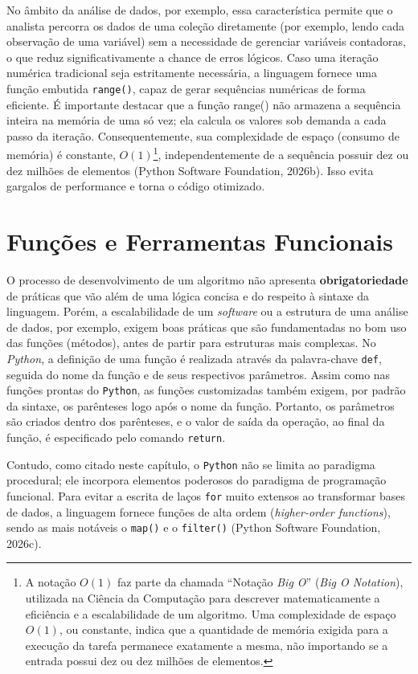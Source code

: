 \documentclass[
  brazilian,
  letterpaper,
  DIV=11,
  numbers=noendperiod]{scrreprt}
\begin{document}
No âmbito da análise de dados, por exemplo, essa característica permite
que o analista percorra os dados de uma coleção diretamente (por
exemplo, lendo cada observação de uma variável) sem a necessidade de
gerenciar variáveis contadoras, o que reduz significativamente a chance
de erros lógicos. Caso uma iteração numérica tradicional seja
estritamente necessária, a linguagem fornece uma função embutida
\texttt{range()}, capaz de gerar sequências numéricas de forma
eficiente. É importante destacar que a função range() não armazena a
sequência inteira na memória de uma só vez; ela calcula os valores sob
demanda a cada passo da iteração. Consequentemente, sua complexidade de
espaço (consumo de memória) é constante, \(O(1)\)\footnote{A notação
  \(O(1)\) faz parte da chamada ``Notação \emph{Big O}'' (\emph{Big O
  Notation}), utilizada na Ciência da Computação para descrever
  matematicamente a eficiência e a escalabilidade de um algoritmo. Uma
  complexidade de espaço \(O(1)\), ou constante, indica que a quantidade
  de memória exigida para a execução da tarefa permanece exatamente a
  mesma, não importando se a entrada possui dez ou dez milhões de
  elementos.}, independentemente de a sequência possuir dez ou dez
milhões de elementos (Python Software Foundation, 2026b). Isso evita
gargalos de performance e torna o código otimizado.

\section{Funções e Ferramentas
Funcionais}\label{funuxe7uxf5es-e-ferramentas-funcionais}

O processo de desenvolvimento de um algoritmo não apresenta
\textbf{obrigatoriedade} de práticas que vão além de uma lógica concisa
e do respeito à sintaxe da linguagem. Porém, a escalabilidade de um
\emph{software} ou a estrutura de uma análise de dados, por exemplo,
exigem boas práticas que são fundamentadas no bom uso das funções
(métodos), antes de partir para estruturas mais complexas. No
\emph{Python}, a definição de uma função é realizada através da
palavra-chave \texttt{def}, seguida do nome da função e de seus
respectivos parâmetros. Assim como nas funções prontas do
\texttt{Python}, as funções customizadas também exigem, por padrão da
sintaxe, os parênteses logo após o nome da função. Portanto, os
parâmetros são criados dentro dos parênteses, e o valor de saída da
operação, ao final da função, é especificado pelo comando
\texttt{return}.

Contudo, como citado neste capítulo, o \texttt{Python} não se limita ao
paradigma procedural; ele incorpora elementos poderosos do paradigma de
programação funcional. Para evitar a escrita de laços \texttt{for} muito
extensos ao transformar bases de dados, a linguagem fornece funções de
alta ordem (\emph{higher-order functions}), sendo as mais notáveis o
\texttt{map()} e o \texttt{filter()} (Python Software Foundation,
2026c).
\end{document}
